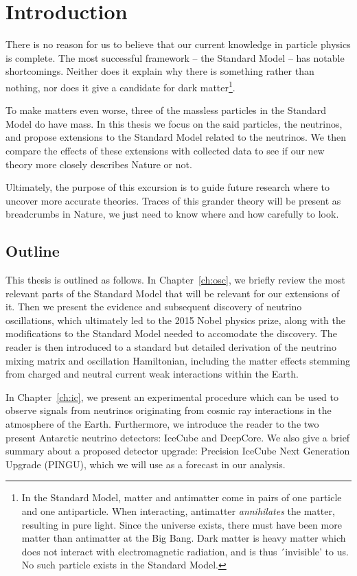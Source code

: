 \chapter{Introduction}
There is no reason for us to believe that our current knowledge in particle physics is complete.
The most successful framework -- the Standard Model -- has notable shortcomings. Neither does it 
explain why there is something rather than nothing, nor does it give a candidate for dark matter\footnote{In the Standard Model,
matter and antimatter come in pairs of one particle and one antiparticle. When interacting,
antimatter \emph{annihilates} the matter, resulting in pure light. Since the universe exists,
there must have been more matter than antimatter at the Big Bang. %
Dark matter is heavy matter which does not interact
with electromagnetic radiation, and is thus ´invisible' to us. 
No such particle exists in the Standard Model.}.

To make matters even worse, three of the massless particles in the Standard Model do have mass.
In this thesis we focus on the said particles, the neutrinos, and propose extensions to the Standard Model
related to the neutrinos. We then compare the effects of these extensions with collected data to see 
if our new theory more closely describes Nature or not. 

Ultimately, the purpose of this excursion is to guide future research where to uncover more accurate theories.
Traces of this grander theory will be present as breadcrumbs in Nature, we just need to know where 
and how carefully to look. 

\section{Outline}
This thesis is outlined as follows. In Chapter~\ref{ch:osc}, we briefly review the most relevant parts 
of the Standard Model that will be relevant for our extensions of it. Then we present the evidence and 
subsequent discovery of neutrino oscillations, which ultimately led to the 2015 Nobel physics prize, 
along with the modifications to the Standard Model needed to accomodate the discovery. The 
reader is then introduced to a standard but detailed derivation of the neutrino mixing matrix
and oscillation Hamiltonian, including the matter 
effects stemming from charged and neutral current weak interactions within the Earth.

In Chapter~\ref{ch:ic}, we present an experimental procedure which can be used to observe signals from neutrinos originating
from cosmic ray interactions in the atmosphere of the Earth. Furthermore, we introduce the reader to 
the two present Antarctic neutrino detectors: IceCube and DeepCore. We also give a brief summary 
about a proposed detector upgrade: Precision IceCube Next Generation Upgrade (PINGU), which 
we will use as a forecast in our analysis.


